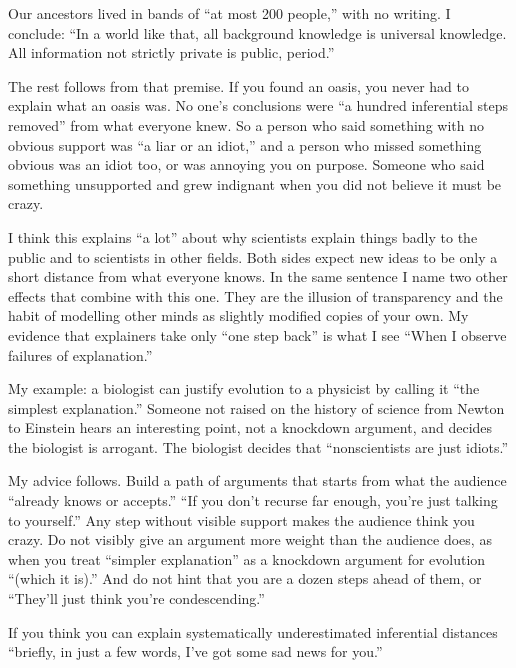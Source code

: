 
Our ancestors lived in bands of ``at most 200 people,'' with no writing. I conclude: ``In a world like that, all background knowledge is universal knowledge. All information not strictly private is public, period.'' 

The rest follows from that premise. If you found an oasis, you never had to explain what an oasis was. No one's conclusions were ``a hundred inferential steps removed'' from what everyone knew. So a person who said something with no obvious support was ``a liar or an idiot,'' and a person who missed something obvious was an idiot too, or was annoying you on purpose. Someone who said something unsupported and grew indignant when you did not believe it must be crazy.

I think this explains ``a lot'' about why scientists explain things badly to the public and to scientists in other fields. Both sides expect new ideas to be only a short distance from what everyone knows. In the same sentence I name two other effects that combine with this one. They are the illusion of transparency and the habit of modelling other minds as slightly modified copies of your own.  My evidence that explainers take only ``one step back'' is what I see ``When I observe failures of explanation.'' 

My example: a biologist can justify evolution to a physicist by calling it ``the simplest explanation.'' Someone not raised on the history of science from Newton to Einstein hears an interesting point, not a knockdown argument, and decides the biologist is arrogant. The biologist decides that ``nonscientists are just idiots.''

My advice follows. Build a path of arguments that starts from what the audience ``already knows or accepts.'' ``If you don't recurse far enough, you're just talking to yourself.'' Any step without visible support makes the audience think you crazy. Do not visibly give an argument more weight than the audience does, as when you treat ``simpler explanation'' as a knockdown argument for evolution ``(which it is).'' And do not hint that you are a dozen steps ahead of them, or ``They'll just think you're condescending.''

If you think you can explain systematically underestimated inferential distances ``briefly, in just a few words, I've got some sad news for you.''
